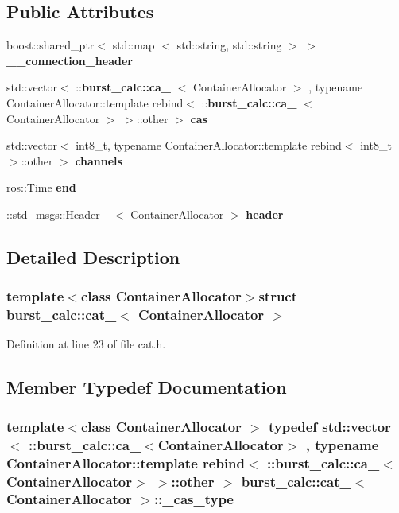 \subsection*{\-Public \-Attributes}
\begin{DoxyCompactItemize}
\item 
boost\-::shared\-\_\-ptr$<$ std\-::map\*
$<$ std\-::string, std\-::string $>$ $>$ {\bf \-\_\-\-\_\-connection\-\_\-header}
\item 
std\-::vector$<$ \-::{\bf burst\-\_\-calc\-::ca\-\_\-}\*
$<$ \-Container\-Allocator $>$\*
, typename \*
\-Container\-Allocator\-::template \*
rebind$<$ \-::{\bf burst\-\_\-calc\-::ca\-\_\-}\*
$<$ \-Container\-Allocator $>$\*
 $>$\-::other $>$ {\bf cas}
\item 
std\-::vector$<$ int8\-\_\-t, typename \*
\-Container\-Allocator\-::template \*
rebind$<$ int8\-\_\-t $>$\-::other $>$ {\bf channels}
\item 
ros\-::\-Time {\bf end}
\item 
\-::std\-\_\-msgs\-::\-Header\-\_\-\*
$<$ \-Container\-Allocator $>$ {\bf header}
\end{DoxyCompactItemize}


\subsection{\-Detailed \-Description}
\subsubsection*{template$<$class Container\-Allocator$>$struct burst\-\_\-calc\-::cat\-\_\-$<$ Container\-Allocator $>$}



\-Definition at line 23 of file cat.\-h.



\subsection{\-Member \-Typedef \-Documentation}
\subsubsection[{\-\_\-cas\-\_\-type}]{\setlength{\rightskip}{0pt plus 5cm}template$<$class Container\-Allocator $>$ typedef std\-::vector$<$ \-::{\bf burst\-\_\-calc\-::ca\-\_\-}$<$\-Container\-Allocator$>$ , typename \-Container\-Allocator\-::template rebind$<$ \-::{\bf burst\-\_\-calc\-::ca\-\_\-}$<$\-Container\-Allocator$>$ $>$\-::other $>$ {\bf burst\-\_\-calc\-::cat\-\_\-}$<$ \-Container\-Allocator $>$\-::{\bf \-\_\-cas\-\_\-type}}\label{structburst__calc_1_1cat___ad60d84ad2f3e806136330ac35723371e}


